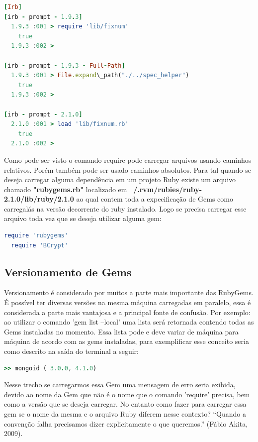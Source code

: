 {\singlespace
\begin{lstlisting}[caption=Exemplo de require e load Ruby 1.9.3 - 2.1.0,language=Ruby,label={test}]
[Irb]
[irb - prompt - 1.9.3]
  1.9.3 :001 > require 'lib/fixnum'
    true
  1.9.3 :002 >

[irb - prompt - 1.9.3 - Full-Path]
  1.9.3 :001 > File.expand\_path("./../spec_helper")
    true
  1.9.3 :002 >

[irb - prompt - 2.1.0]
  2.1.0 :001 > load 'lib/fixnum.rb'
    true
  2.1.0 :002 >
\end{lstlisting}
}

Como pode ser visto o comando  require pode carregar arquivos usando caminhos relativos. Porém também pode ser usado caminhos absolutos. Para tal quando se deseja carregar alguma dependência em um projeto Ruby existe um arquivo chamado \textbf{"rubygems.rb"} localizado em \textbf{~/.rvm/rubies/ruby-2.1.0/lib/ruby/2.1.0} ao qual contem toda a
expecificação de Gems como carregalás na versão decorrente do ruby instalado. Logo se precisa carregar esse arquivo toda vez que se deseja utilizar alguma gem:

{\singlespace
\begin{lstlisting}[caption=Exemplo de require 'rubygems',language=Ruby,label={require}]
  require 'rubygems'
  require 'BCrypt'
\end{lstlisting}
}

\subsection{Versionamento de Gems}
Versionamento é considerado por muitos a parte mais importante das RubyGems. É possível ter diversas versões na mesma máquina carregadas em
paralelo, essa é considerada a parte mais vantajosa e a principal fonte de confusão. Por exemplo: ao utilizar o comando 'gem list --local' 
uma lista será retornada contendo todas as Gems instaladas no momento. Essa lista pode e deve variar de máquina para máquina de acordo com 
as gems instaladas, para exemplificar  esse conceito seria como descrito na saída do terminal a seguir:

{\singlespace
\begin{lstlisting}[caption=Exemplo de versionamento de gems,language=Ruby,label={versionamento}]
  >> mongoid ( 3.0.0, 4.1.0)
\end{lstlisting}
}

Nesse trecho se carregarmos essa Gem uma mensagem de erro seria exibida, devido ao nome da Gem que não é o nome que o comando 'require' precisa, bem como a versão que se deseja carregar.
No entanto como fazer para carregar essa gem se o nome da mesma e o arquivo Ruby diferem nesse contexto? “Quando a convenção falha precisamos dizer explicitamente o que queremos.” 
(Fábio Akita, 2009).

